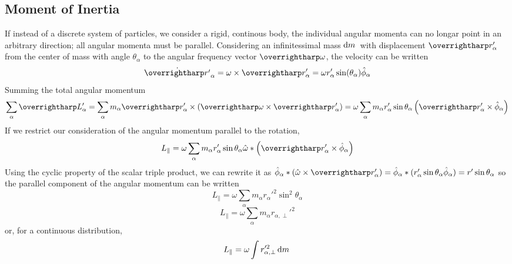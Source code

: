 \subsection{Moment of Inertia}
If instead of a discrete system of particles, we consider a rigid, continous body, the individual angular momenta can no longar point in an arbitrary direction; all angular momenta must be parallel. Considering an infinitessimal mass \(\d{m}\) with displacement \(\vv{r}'_\alpha\) from the center of mass with angle \(\theta_\alpha\) to the angular frequency vector \(\vv\omega\), the velocity can be written
\[\dot {\vv r'}_\alpha = \omega\times \vv{r}'_\alpha=\omega r_\alpha ' \sin(\theta_\alpha)\hat \phi_\alpha\]
Summing the total angular momentum
\[\sum_\alpha \vv L'_\alpha = \sum_\alpha m_\alpha \vv r_\alpha ' \times \left(\vv\omega \times \vv r'_\alpha\right) = \omega \sum_\alpha m_\alpha r_\alpha ' \sin\theta_\alpha \left(\vv{r}_\alpha ' \times\hat \phi_\alpha\right)\]
If we restrict our consideration of the angular momentum parallel to the rotation,
\[L_\parallel = \omega\sum_\alpha m_\alpha r_\alpha ' \sin\theta_\alpha \hat\omega * \left(\vv r'_\alpha \times \hat\phi_\alpha\right)\]
Using the cyclic property of the scalar triple product, we can rewrite it as \(\hat\phi_\alpha * \left(\hat\omega \times \vv r'_\alpha\right) = \hat\phi_\alpha * (r'_\alpha\sin\theta_\alpha\hat\phi_\alpha) = r'\sin\theta_\alpha\)
so the parallel component of the angular momentum can be written
\[L_\parallel = \omega\sum_\alpha m_\alpha r_\alpha'^2 \sin^2\theta_\alpha\]
\begin{equation}
	L_\parallel = \omega\sum_\alpha m_\alpha r_{\alpha,\perp}'^2
\end{equation}
or, for a continuous distribution,
\begin{equation}
	L_\parallel = \omega \int r_{\alpha,\perp}'^2\d{m}
\end{equation}

